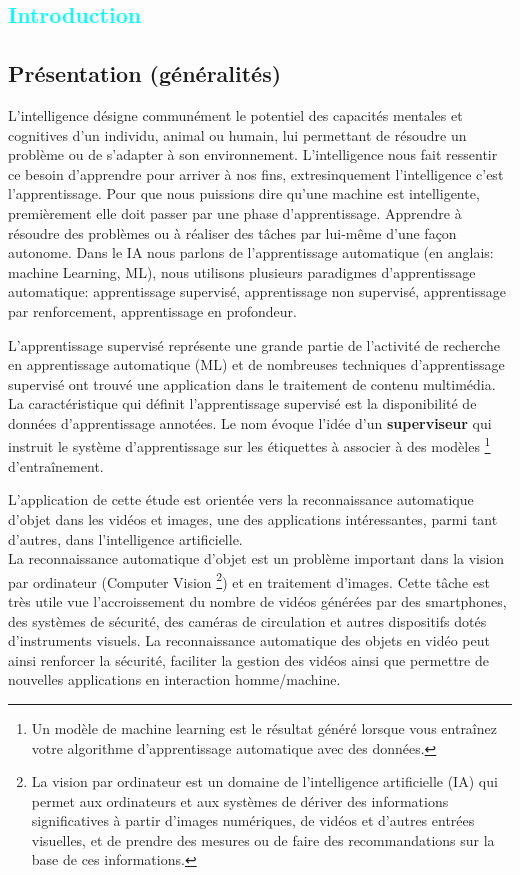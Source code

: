 

\textcolor{cyan}{\chapter{Introduction}}
	\section{Présentation (généralités)}
	
		L’intelligence désigne communément le potentiel des capacités mentales et cognitives d'un individu, animal ou humain, lui permettant de résoudre un problème ou de s'adapter à son environnement. L'intelligence nous fait ressentir ce besoin d’apprendre pour arriver à nos fins, extresinquement l'intelligence c’est l'apprentissage. Pour que nous puissions dire qu’une machine est intelligente, premièrement elle doit passer par une phase d'apprentissage.  Apprendre à résoudre des problèmes ou à réaliser des tâches par lui-même d’une façon autonome. Dans le IA nous parlons de l’apprentissage automatique (en anglais: machine Learning, ML), nous utilisons plusieurs paradigmes d’apprentissage automatique:  apprentissage supervisé, apprentissage non supervisé, apprentissage par renforcement, apprentissage en profondeur.
	
			
		L'apprentissage supervisé représente une grande partie de l'activité de recherche en apprentissage automatique (ML) et de nombreuses techniques d'apprentissage supervisé ont trouvé une application dans le traitement de contenu multimédia. La caractéristique qui définit l'apprentissage supervisé est la disponibilité de données d'apprentissage annotées\cite{cunningham2008supervised}. Le nom évoque l'idée d'un \textbf{superviseur} qui instruit le système d'apprentissage sur les étiquettes à associer à des modèles \footnote{Un modèle de machine learning est le résultat généré lorsque vous entraînez votre algorithme d'apprentissage automatique avec des données.} d'entraînement. 
		
		L’application de cette étude est orientée vers la reconnaissance automatique d'objet dans les vidéos et images, une des applications intéressantes, parmi tant d'autres, dans l'intelligence artificielle.\\
		La reconnaissance automatique d'objet est un problème important dans la vision par ordinateur (Computer Vision 
			\footnote{La vision par ordinateur est un domaine de l'intelligence artificielle (IA) qui permet aux ordinateurs et aux systèmes de dériver des informations significatives à partir d'images numériques, de vidéos et d'autres entrées visuelles, et de prendre des mesures ou de faire des recommandations sur la base de ces informations.}) 
		et en traitement d'images. Cette tâche est très utile vue l'accroissement du nombre de vidéos générées par des smartphones, des systèmes de sécurité, des caméras de circulation et autres dispositifs dotés d'instruments visuels. La reconnaissance automatique des objets en vidéo peut ainsi renforcer la sécurité, faciliter la gestion des vidéos ainsi que permettre de nouvelles applications en interaction homme/machine.	
			
